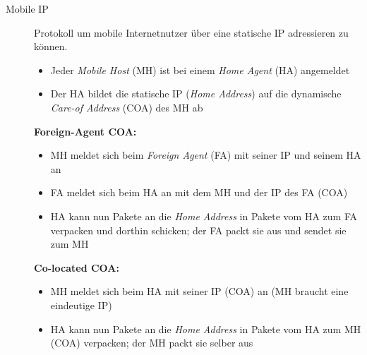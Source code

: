 \documentclass[a4paper]{article}
\begin{document}
\begin{description}
    \item[Mobile IP]
    \begin{samepage}
    Protokoll um mobile Internetnutzer über eine statische IP adressieren zu können.
    \begin{itemize}
        \item Jeder \textit{Mobile Host} (MH) ist bei einem \textit{Home Agent} (HA) angemeldet
        \item Der HA bildet die statische IP (\textit{Home Address}) auf die dynamische \textit{Care-of Address} (COA) des MH ab
    \end{itemize}
    \textbf{Foreign-Agent COA:}
    \begin{itemize}
        \item MH meldet sich beim \textit{Foreign Agent} (FA) mit seiner IP und seinem HA an
        \item FA meldet sich beim HA an mit dem MH und der IP des FA (COA)
        \item HA kann nun Pakete an die \textit{Home Address} in Pakete vom HA zum FA verpacken und dorthin schicken; der FA packt sie aus und sendet sie zum MH
    \end{itemize}
    \textbf{Co-located COA:}
    \begin{itemize}
        \item MH meldet sich beim HA mit seiner IP (COA) an (MH braucht eine eindeutige IP)
        \item HA kann nun Pakete an die \textit{Home Address} in Pakete vom HA zum MH (COA) verpacken; der MH packt sie selber aus
    \end{itemize}
    \end{samepage}
\end{description}
\end{document}
